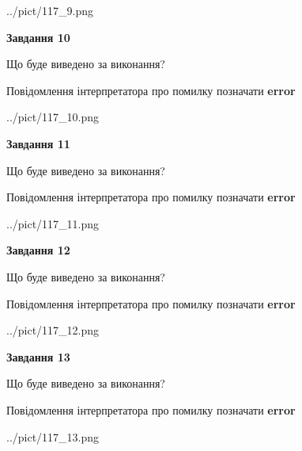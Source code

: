 \documentclass[11pt, ukrainian]{article}
\begin{document}
{\begin {large}
\begin{center}
	{../pict/117_9.png}
\end{center}
\newpage

{\begin {center}\textbf{Завдання 10}\end {center}}\par
Що буде виведено за виконання? \par
Повідомлення інтерпретатора про помилку позначати \textbf{error}

\begin{center}
	{../pict/117_10.png}
\end{center}
\newpage

{\begin {center}\textbf{Завдання 11}\end {center}}\par
Що буде виведено за виконання? \par
Повідомлення інтерпретатора про помилку позначати \textbf{error}

\begin{center}
	{../pict/117_11.png}
\end{center}
\newpage

{\begin {center}\textbf{Завдання 12}\end {center}}\par
Що буде виведено за виконання? \par
Повідомлення інтерпретатора про помилку позначати \textbf{error}

\begin{center}
	{../pict/117_12.png}
\end{center}
\newpage

{\begin {center}\textbf{Завдання 13}\end {center}}\par
Що буде виведено за виконання? \par
Повідомлення інтерпретатора про помилку позначати \textbf{error}

\begin{center}
	{../pict/117_13.png}
\end{center}
\newpage


\end{large}}
\end{document}
